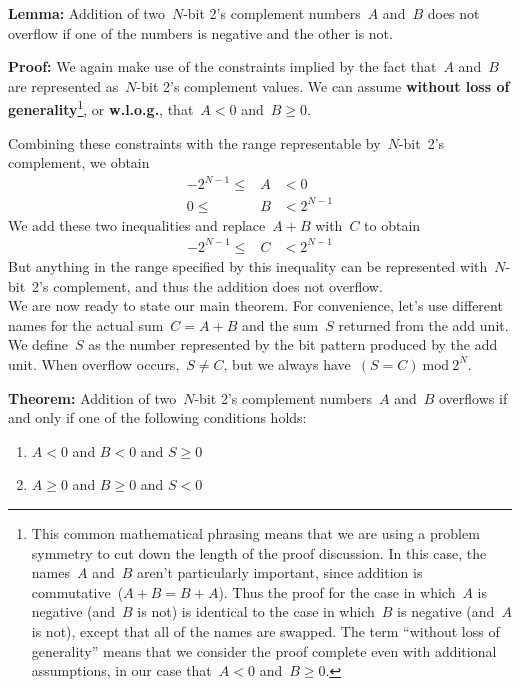{\bf Lemma:} 
%
Addition of two~\mbox{$N$-bit} 2's complement numbers~$A$ and~$B$
does not overflow if one of the numbers is negative and the other is
not.

{\bf Proof:}
%
We again make use of the constraints implied by the fact that~$A$ and~$B$
are represented as~\mbox{$N$-bit} 2's complement values.  We can assume
{\bf without loss of generality}\footnote{This common mathematical phrasing
means that we are using a problem symmetry to cut down the length of the
proof discussion.  In this case, the names~$A$ and~$B$ aren't particularly
important, since addition is commutative~($A+B=B+A$).  Thus the proof
for the case in which~$A$ is negative (and~$B$ is not) is identical to the
case in which~$B$ is negative (and~$A$ is not), except that all of the 
names are swapped.  The term ``without loss of generality'' means that
we consider the proof complete even with additional assumptions, in
our case that~$A<0$ and~$B\geq{0}$.}, or {\bf w.l.o.g.}, 
that~$A<0$ and~$B\geq{0}$.

Combining these constraints with the range representable 
by~\mbox{$N$-bit}~2's complement, we obtain
%
\begin{eqnarray*}
-2^{N-1} \leq & A & < 0\\
0 \leq & B & < 2^{N-1}
\end{eqnarray*}
%
We add these two inequalities and replace~$A+B$ with~$C$ to obtain
%
\begin{eqnarray*}
-2^{N-1} \leq & C & < 2^{N-1}
\end{eqnarray*}
%
But anything in the range specified by this inequality can be represented
with~{$N$-bit}~2's complement, and thus the addition does not overflow.\\


We are now ready to state our main theorem.  For convenience, 
let's use different names for the actual sum~$C=A+B$ and the sum~$S$
returned from the add unit.  We define~$S$ as the number represented by
the bit pattern produced by the add unit.  When overflow 
occurs,~$S\not=C$, but we always have~$(S=C)~\mbox{mod}~2^N$.

{\bf Theorem:} 
%
Addition of two~\mbox{$N$-bit} 2's complement numbers~$A$ and~$B$
overflows if and only if one of the following conditions holds:
\begin{enumerate}
\item{$A<0$ and $B<0$ and $S\geq{0}$}
\item{$A\geq{0}$ and $B\geq{0}$ and $S<0$}
\end{enumerate}

